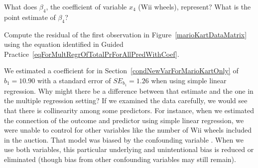 \begin{exercisewrap}
\begin{nexercise}
What does $\beta_4$, the coefficient of variable
$x_4$ (Wii wheels), represent?
What is the point estimate of $\beta_4$?\footnotemark{}
\end{nexercise}
\end{exercisewrap}

\begin{exercisewrap}
\begin{nexercise}
\label{computeMultipleRegressionResidualForMarioKart}%
Compute the residual of the first observation in
Figure~\ref{marioKartDataMatrix} using the equation identified
in Guided Practice~\ref{eqForMultRegrOfTotalPrForAllPredWithCoef}.%
\footnotemark{}
\end{nexercise}
\end{exercisewrap}

\begin{examplewrap}
\begin{nexample}{We estimated a coefficient for
     in
    Section~\ref{condNewVarForMarioKartOnly}
    of $b_1 = 10.90$ with a standard error of $SE_{b_1} = 1.26$
    when using simple linear regression.
    Why might there be a difference between that estimate
    and the one in the multiple regression setting?}
  \label{colinearityOfCondNewAndStockPhoto}%
  If we examined the data carefully, we would see that
  there is collinearity among some predictors.
  For instance, when we estimated the connection of the outcome
   and predictor  using simple linear
  regression, we were unable to control for other variables like
  the number of Wii wheels included in the auction.
  That model was biased by the confounding variable .
  When we use both variables, this particular underlying and
  unintentional bias is reduced or eliminated (though bias
  from other confounding variables may still remain).
\end{nexample}
\end{examplewrap}


